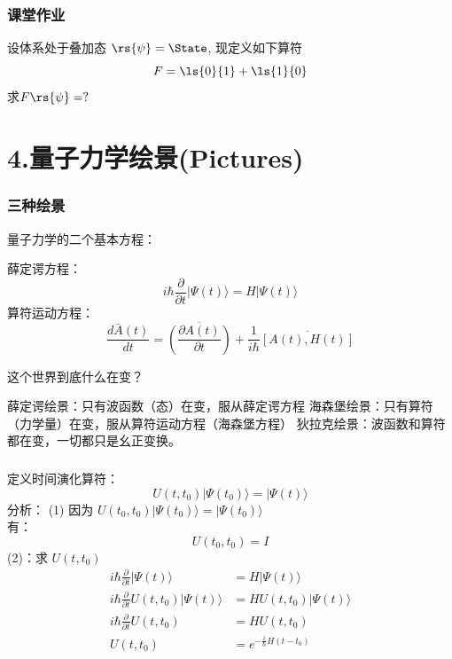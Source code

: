 \begin{frame} 
    \frametitle{课堂作业}
    设体系处于叠加态 $\rs{\psi}=\State$, 现定义如下算符
    \[F= \ls{0}{1}+\ls{1}{0}\]
    求$F\rs{\psi}=?$  
\end{frame} 

\section{4.量子力学绘景(Pictures)}

\begin{frame}  
    \frametitle{三种绘景}
    量子力学的二个基本方程：  
    \begin{enumerate}
        \Item 薛定谔方程：$$ i\hbar \frac{\partial }{\partial t} |\Psi(t)\rangle = H|\Psi(t)\rangle $$
        \Item 算符运动方程：$$ \frac{d\bar{A}(t)}{dt}=\overline{(\frac{\partial A(t) }{\partial t})}  +\frac{1}{i\hbar} \overline{[A(t),H(t)]}$$
    \end{enumerate}
    这个世界到底什么在变？\\
    \begin{itemize}
        \done 薛定谔绘景：只有波函数（态）在变，服从薛定谔方程
        \done 海森堡绘景：只有算符（力学量）在变，服从算符运动方程（海森堡方程）
        \done 狄拉克绘景：波函数和算符都在变，一切都只是幺正变换。
    \end{itemize}
\end{frame} 

\begin{frame}  
    \frametitle{}  
    定义时间演化算符：
    $$ U(t,t_0) |\Psi(t_0)\rangle = |\Psi(t)\rangle  $$
    \alert{分析}：
    (1) 因为 $ U(t_0,t_0) |\Psi(t_0)\rangle = |\Psi(t_0)\rangle  $ \\
     有：$$ U(t_0,t_0)=I $$
    (2)：求 $ U(t,t_0)$
    $$ \begin{aligned}
        i\hbar \frac{\partial }{\partial t} |\Psi(t)\rangle &= H|\Psi(t)\rangle  \\
        i\hbar \frac{\partial }{\partial t}  U(t,t_0) |\Psi(t)\rangle &= H U(t,t_0) |\Psi(t)\rangle  \\
        i\hbar \frac{\partial }{\partial t}  U(t,t_0)  &= H U(t,t_0)  \\
        U(t,t_0)  &= e^{-\frac{i}{\hbar} H(t-t_0)}  \\
    \end{aligned} $$
\end{frame} 

